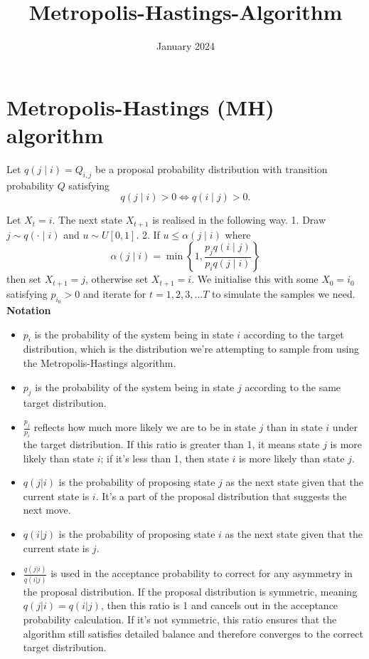 \documentclass{article}
\title{Metropolis-Hastings-Algorithm}
\date{January 2024}
\begin{document}
\maketitle
\section{Metropolis-Hastings (MH) algorithm}
Let $q(j \mid i)=Q_{i, j}$ be a proposal probability distribution with transition probability $Q$ satisfying
$$
q(j \mid i)>0 \Leftrightarrow q(i \mid j)>0 .
$$

Let $X_t=i$. The next state $X_{t+1}$ is realised in the following way.
1. Draw $j \sim q(\cdot \mid i)$ and $u \sim U[0,1]$.
2. If $u \leq \alpha(j \mid i)$ where
$$
\alpha(j \mid i)=\min \left\{1, \frac{p_j q(i \mid j)}{p_i q(j \mid i)}\right\}
$$
then set $X_{t+1}=j$, otherwise set $X_{t+1}=i$.
We initialise this with some $X_0=i_0$ satisfying $p_{i_0}>0$ and iterate for $t=1,2,3, \ldots T$ to simulate the samples we need. 
\newline
\textbf{Notation}
\begin{itemize}
    \item \( p_i \) is the probability of the system being in state \( i \) according to the target distribution, which is the distribution we're attempting to sample from using the Metropolis-Hastings algorithm.
    \item \( p_j \) is the probability of the system being in state \( j \) according to the same target distribution.
    \item  \( \frac{p_j}{p_i} \) reflects how much more likely we are to be in state \( j \) than in state \( i \) under the target distribution. If this ratio is greater than 1, it means state \( j \) is more likely than state \( i \); if it's less than 1, then state \( i \) is more likely than state \( j \).
\end{itemize}
\newline
\begin{itemize}
    \item \( q(j|i) \) is the probability of proposing state \( j \) as the next state given that the current state is \( i \). It's a part of the proposal distribution that suggests the next move.
    \item \( q(i|j) \) is the probability of proposing state \( i \) as the next state given that the current state is \( j \).
    \item  \( \frac{q(j|i)}{q(i|j)} \) is used in the acceptance probability to correct for any asymmetry in the proposal distribution. If the proposal distribution is symmetric, meaning \( q(j|i) = q(i|j) \), then this ratio is 1 and cancels out in the acceptance probability calculation. If it's not symmetric, this ratio ensures that the algorithm still satisfies detailed balance and therefore converges to the correct target distribution.
\end{itemize}
\newline
\end{document}
